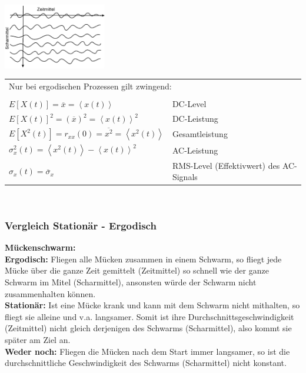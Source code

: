 	\begin{minipage}{5cm}
		\includegraphics[width=4.5cm]{bilder/zeit-scharmittel.png}
  	\end{minipage}
	\begin{minipage}{13.5cm}

	\begin{tabular}{ll}
  		\multicolumn{2}{l}{Nur bei ergodischen Prozessen gilt zwingend:} \\ \\
      $E[X(t)] = \overline{x} = \left\langle x(t) \right\rangle$ & DC-Level \\
      $E[X(t)]^{2} = (\overline{x})^{2} = \left\langle x(t) \right\rangle^{2}$ & DC-Leistung \\
      $E[X^{2}(t)] = r_{xx}(0) = \overline{x^{2}} = 
                     \left\langle x^{2}(t) \right\rangle $ & Gesamtleistung \\
      $\sigma_{x}^{2}(t) = \left\langle x^{2}(t) \right\rangle 
                           - \left\langle x(t) \right\rangle^{2}$ & AC-Leistung \\
      $\sigma_{x}(t) = \overline{\sigma}_{x}$ & RMS-Level (Effektivwert) des AC-Signals\\
    \end{tabular} \\
  	\end{minipage}


\subsubsection{Vergleich Stationär - Ergodisch}
\textbf{Mückenschwarm:}\\
\textbf{Ergodisch:} Fliegen alle Mücken zusammen in einem Schwarm, so fliegt jede Mücke über die
ganze Zeit gemittelt (Zeitmittel) so schnell wie der ganze Schwarm im Mitel (Scharmittel), ansonsten
würde der Schwarm nicht zusammenhalten können. \\
\textbf{Stationär:} Ist eine Mücke krank und kann mit dem Schwarm nicht mithalten, so fliegt sie
alleine und v.a. langsamer. Somit ist ihre Durchschnittsgeschwindigkeit (Zeitmittel) nicht gleich
derjenigen des Schwarms (Scharmittel), also kommt sie später am Ziel an. \\
\textbf{Weder noch:} Fliegen die Mücken nach dem Start immer langsamer, so ist die
durchschnittliche Geschwindigkeit des Schwarms (Scharmittel) nicht konstant.

